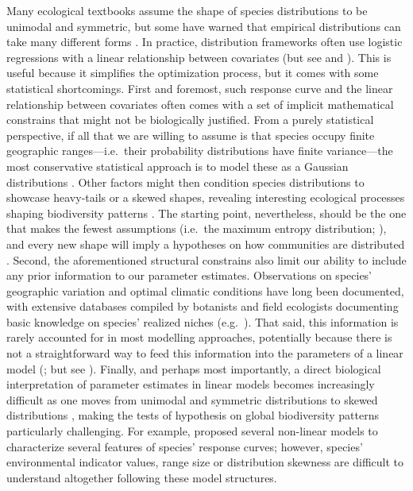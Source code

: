 \documentclass[11pt, a4paper]{article}
\begin{document}
Many ecological textbooks \citep{krebsEcologyExperimentalAnalysis1972} assume the shape of species distributions to be unimodal and symmetric, but some have warned that empirical distributions can take many different forms \citep{austinModelsAnalysisSpecies1987, austinSpatialPredictionSpecies2002}. In practice, distribution frameworks often use logistic regressions with a linear relationship between covariates (but see \citealt{review} and \citealt{good example}). This is useful because it simplifies the optimization process, but it comes with some statistical shortcomings. First and foremost, such response curve and the linear relationship between covariates often comes with a set of implicit mathematical constrains that might not be biologically justified. From a purely statistical perspective, if all that we are willing to assume is that species occupy finite geographic ranges---i.e.~their probability distributions have finite variance---the most conservative statistical approach is to model these as a Gaussian distributions \citep{frankCommonPatternsNature2009}. Other factors might then condition species distributions to showcase heavy-tails or a skewed shapes, revealing interesting ecological processes shaping biodiversity patterns \citep{austinNonlinearSpeciesResponse1976, minchinEvaluationRelativeRobustness1987}. The starting point, nevertheless, should be the one that makes the fewest assumptions (i.e.~the maximum entropy distribution; \citealt{frankCommonPatternsNature2009}), and every new shape will imply a hypotheses on how communities are distributed \citep{damenSpatialPredictionsCommunity2017}. Second, the aforementioned structural constrains also limit our ability to include any prior information to our parameter estimates. Observations on species' geographic variation and optimal climatic conditions have long been documented, with extensive databases compiled by botanists and field ecologists documenting basic knowledge on species' realized niches (e.g.~\citealt{landoltFloraIndicativaOkologische2010}). That said, this information is rarely accounted for in most modelling approaches, potentially because there is not a straightforward way to feed this information into the parameters of a linear model (\citealt{scherrerEcologicalIndicatorValues2019}; but see \citealt{terbraakWeightedAveragingLogistic1986, ovaskainenHowMakeMore2017}). Finally, and perhaps most importantly, a direct biological interpretation of parameter estimates in linear models becomes increasingly difficult as one moves from unimodal and symmetric distributions \citep{terbraakWeightedAveragingLogistic1986, jamilGeneralizedLinearMixed2013} to skewed distributions \citep{huismanHierarchicalSetModels1993}, making the tests of hypothesis on global biodiversity patterns particularly challenging. For example, \citet{huismanHierarchicalSetModels1993} proposed several non-linear models to characterize several features of species' response curves; however, species' environmental indicator values, range size or distribution skewness are difficult to understand altogether following these model structures.
\end{document}
